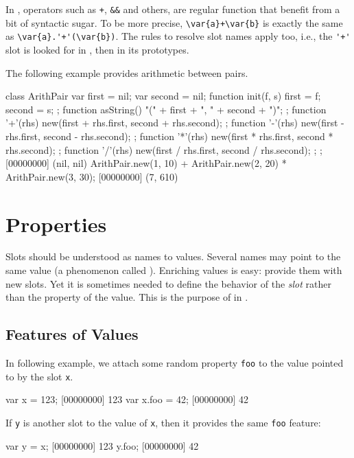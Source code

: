 In \us, operators such as \lstinline|+|, \lstinline|&&| and others,
are regular function that benefit from a bit of syntactic sugar.  To
be more precise, \lstinline|\var{a}+\var{b}| is exactly the same as
\lstinline|\var{a}.'+'(\var{b})|.  The rules to resolve slot names
apply too, i.e., the \lstinline|'+'| slot is looked for in ,
then in its prototypes.

The following example provides arithmetic between pairs.

\begin{urbiscript}
class ArithPair
{
  var first = nil;
  var second = nil;
  function init(f, s) { first = f;   second = s;  };
  function asString() { "(" + first + ", " + second + ")"; };
  function '+'(rhs) { new(first + rhs.first, second + rhs.second); };
  function '-'(rhs) { new(first - rhs.first, second - rhs.second); };
  function '*'(rhs) { new(first * rhs.first, second * rhs.second); };
  function '/'(rhs) { new(first / rhs.first, second / rhs.second); };
};
[00000000] (nil, nil)
ArithPair.new(1, 10) + ArithPair.new(2, 20) * ArithPair.new(3, 30);
[00000000] (7, 610)
\end{urbiscript}

\section{Properties}
\label{sec:tut:prop}

Slots should be understood as names to values.  Several names may point to
the same value (a phenomenon called ).  Enriching values is
easy: provide them with new slots.  Yet it is sometimes needed to define the
behavior of the \emph{slot} rather than the property of the value.  This is
the purpose of  in \us.

\subsection{Features of Values}
In following example, we attach some random property \lstinline|foo| to the
value pointed to by the slot \lstinline|x|.

\begin{urbiscript}
var x = 123;
[00000000] 123
var x.foo = 42;
[00000000] 42
\end{urbiscript}

If \lstinline|y| is another slot to the value of \lstinline|x|, then it
provides the same \lstinline|foo| feature:

\begin{urbiscript}
var y = x;
[00000000] 123
y.foo;
[00000000] 42
\end{urbiscript}

